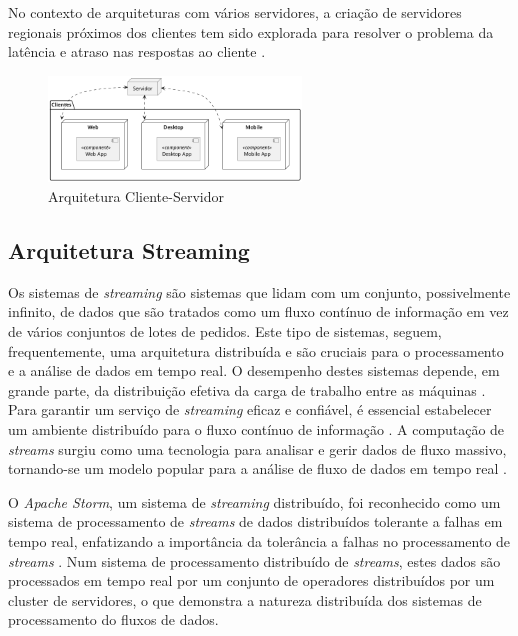 No contexto de arquiteturas com vários servidores, a criação de servidores regionais próximos dos 
clientes tem sido explorada para resolver o problema da latência e atraso nas respostas ao cliente 
\cite{clientserver2022b}. 

\begin{figure}[H]
    \centering
    \includegraphics[width=0.6\textwidth]{media/content/estado-arte/client-server.png}
    \caption{Arquitetura Cliente-Servidor}
    \label{fig:client-server}
\end{figure}

\subsection{Arquitetura Streaming}

Os sistemas de \textit{streaming} são sistemas que lidam com um conjunto, possivelmente infinito, de
dados que são tratados como um fluxo contínuo de informação em vez de vários conjuntos de lotes de  
pedidos. Este tipo de sistemas, seguem, frequentemente, uma arquitetura distribuída e são cruciais 
para o processamento e a análise de dados em tempo real. O desempenho destes sistemas depende, 
em grande parte, da distribuição efetiva da carga de trabalho entre as máquinas \cite{stream2020}. 
Para garantir um serviço de \textit{streaming} eficaz e confiável, é essencial estabelecer um 
ambiente distribuído para o fluxo contínuo de informação \cite{stream2014}. A computação de 
\textit{streams} surgiu como uma tecnologia para analisar e gerir dados de fluxo massivo, 
tornando-se um modelo popular para a análise de fluxo de dados em tempo real 
\cite{stream2018} \cite{stream2018b}.

O \textit{Apache Storm}, um sistema de \textit{streaming} distribuído, foi reconhecido como um 
sistema de processamento de \textit{streams} de dados distribuídos tolerante a falhas em tempo real, 
enfatizando a importância da tolerância a falhas no processamento de \textit{streams} 
\cite{stormattwitter}. Num sistema de processamento distribuído de \textit{streams}, estes dados 
são processados em tempo real por um conjunto de operadores distribuídos por um \gls{cluster}
de servidores, o que demonstra a natureza distribuída dos sistemas de processamento do fluxos de dados.


